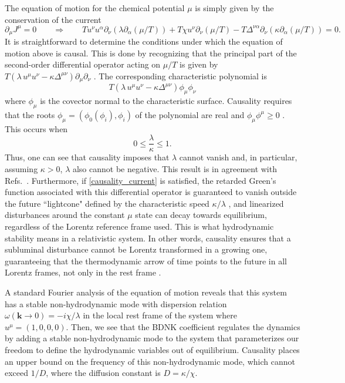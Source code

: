 \documentclass[aps,prd,nofootinbib,amsmath,amssymb,showpacs,longbibliography,singlecolumn,superscriptaddress,notitlepage]{revtex4-1}
\theoremstyle{plain}
\theoremstyle{definition}
\newcommand{\be}{\begin{equation}}
\newcommand{\ee}{\end{equation}}
\begin{document}
The equation of motion for the chemical potential $\mu$ is simply given by the conservation of the current
\be
\partial_\mu J^\mu=0 \qquad \Longrightarrow \qquad  T u^\nu u^\alpha \partial_\nu \left(\lambda \partial_\alpha (\mu/T)\right) + T\chi u^\nu \partial_\nu (\mu/T) - T \Delta^{\nu\alpha}\partial_\nu \left(\kappa \partial_\alpha(\mu/T)\right)=0. 
\label{EOMcurrent}
\ee
It is straightforward to determine the conditions under which the equation of motion above is causal. This is done by recognizing that the principal part of the second-order differential operator acting on $\mu/T$ is given by  $T\left(\lambda\, u^\mu u^\nu  - \kappa \Delta^{\mu\nu}\right)\partial_\mu \partial_\nu$ \cite{ChoquetBruhatGRBook}. The corresponding characteristic polynomial is
\be
T\left(\lambda\, u^\mu u^\nu  - \kappa \Delta^{\mu\nu}\right)\phi_\mu \phi_\nu
\ee
where $\phi_\mu$ is the covector normal to the characteristic surface. Causality requires that the roots $\phi_\mu = (\phi_0(\phi_i),\phi_i)$ of the polynomial are real and $\phi_\mu \phi^\mu \geq 0$ \cite{Bemfica:2020zjp}. This occurs when 
\be
0 \leq \frac{\lambda}{\kappa} \leq 1.
\label{causality_current}
\ee
Thus, one can see that causality imposes that $\lambda$ cannot vanish and, in particular, assuming $\kappa >0$, $\lambda$ also cannot be negative. This result is in agreement with Refs.\ \cite{Hoult:2020eho,Abboud:2023hos}. Furthermore, if \eqref{causality_current} is satisfied, the retarded Green's function associated with this differential operator is guaranteed to vanish outside the future ``lightcone" defined by the characteristic speed $\kappa/\lambda$ \cite{WaldBookGR1984,ChoquetBruhatGRBook}, and linearized disturbances around the constant $\mu$ state can decay towards equilibrium, regardless of the Lorentz reference frame used. This is what hydrodynamic stability means in a relativistic system. In other words, causality ensures that a subluminal disturbance cannot be Lorentz transformed in a growing one, guaranteeing that the thermodynamic arrow of time points to the future in all Lorentz frames, not only in the rest frame \cite{Gavassino:2021owo}.

A standard Fourier analysis \cite{Hiscock:1985zz} of the equation of motion reveals that this system has a stable non-hydrodynamic mode with dispersion relation $\omega(\mathbf{k}\to 0) = - i\chi/\lambda$ in the local rest frame of the system where $u^\mu = (1,0,0,0)$. Then, we see that the BDNK coefficient regulates the dynamics by adding a stable non-hydrodynamic mode to the system that parameterizes our freedom to define the hydrodynamic variables out of equilibrium. Causality places an upper bound on the frequency of this non-hydrodynamic mode, which cannot exceed $1/D$, where the diffusion constant is $D = \kappa/\chi$. 
\end{document}
